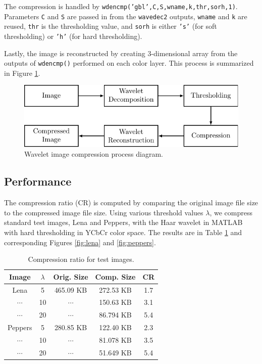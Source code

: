 \documentclass[12pt]{article}
\theoremstyle{definition}
\begin{document}
  The compression is handled by \texttt{wdencmp('gbl',C,S,wname,k,thr,sorh,1)}. Parameters \texttt{C} and \texttt{S} are passed in from the \texttt{wavedec2} outputs, \texttt{wname} and \texttt{k} are reused, \texttt{thr} is the thresholding value, and \texttt{sorh} is either \texttt{'s'} (for soft thresholding) or \texttt{'h'} (for hard thresholding).

  Lastly, the image is reconstructed by creating 3-dimensional array from the outputs of \texttt{wdencmp()} performed on each color layer. This process is summarized in Figure \ref{fig:process-diagram}.

  \begin{figure}
    \centering
    \includegraphics{figs/fig-process.pdf}
    \caption{Wavelet image compression process diagram.}
    \label{fig:process-diagram}
  \end{figure}

  \subsection{Performance}
  The compression ratio (CR) is computed by comparing the original image file size to the compressed image file size. Using various threshold values \(\lambda\), we compress standard test images, Lena and Peppers, with the Haar wavelet in MATLAB with hard thresholding in YCbCr color space. The results are in Table \ref{tab:compression-ratio} and corresponding Figures
  \ref{fig:lena} and \ref{fig:peppers}.

  \begin{table}[ht]
    \centering
    \begin{tabular}{c|c|c|c|c}
      Image & \(\lambda\) & Orig. Size & Comp. Size & CR\\
      \hline
      Lena & 5 & 465.09 KB & 272.53 KB & 1.7\\
      $\cdots$ & 10 & $\cdots$ & 150.63 KB & 3.1\\
      $\cdots$ & 20 & $\cdots$ & 86.794 KB & 5.4\\
      \hline
      Peppers & 5 & 280.85 KB & 122.40 KB & 2.3\\
      $\cdots$ & 10 & $\cdots$ & 81.078 KB & 3.5\\
      $\cdots$ & 20 & $\cdots$ & 51.649 KB & 5.4
    \end{tabular}
    \caption{Compression ratio for test images.}
    \label{tab:compression-ratio}
  \end{table}
\end{document}
